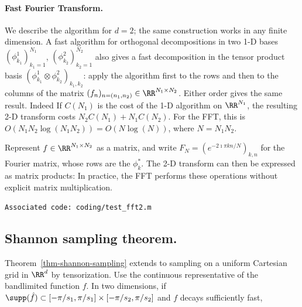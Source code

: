 \paragraph{Fast Fourier Transform.}

We describe the algorithm for $d=2$; the same construction works in any finite dimension.
%
A fast algorithm for orthogonal decompositions in two 1-D bases $(\phi_{k_1}^{1})_{k_1=1}^{N_1}$, $(\phi_{k_2}^{2})_{k_2=1}^{N_2}$ also gives a fast decomposition in the tensor product basis
$(\phi_{k_1}^{1} \otimes \phi_{k_2}^{2})_{k_1,k_2}$: apply the algorithm first to the rows and then to the columns of the matrix $(f_n)_{n=(n_1,n_2)} \in \RR^{N_1 \times N_2}$. Either order gives the same result.
%
Indeed
If $C(N_1)$ is the cost of the 1-D algorithm on $\RR^{N_1}$, the resulting 2-D transform costs $N_2 C(N_1)+N_1 C(N_2)$. For the FFT, this is $O(N_1 N_2 \log(N_1 N_2))=O(N \log(N))$, where $N=N_1 N_2$.

Represent $f \in \RR^{N_1 \times N_2}$ as a matrix, and write $F_N=(e^{-2\imath\pi kn/N})_{k,n}$ for the Fourier matrix, whose rows are the $\phi_k^*$. The 2-D transform can then be expressed as matrix products:
In practice, the FFT performs these operations without explicit matrix multiplication.



\texttt{Associated code: coding/test\_fft2.m}


\subsection{Shannon sampling theorem.}

Theorem~\ref{thm-shannon-sampling} extends to sampling on a uniform Cartesian grid in $\RR^d$ by tensorization. Use the continuous representative of the bandlimited function $f$. In two dimensions, if $\supp(\hat f) \subset [-\pi/s_1,\pi/s_1] \times [-\pi/s_2,\pi/s_2]$ and $f$ decays sufficiently fast,
	

